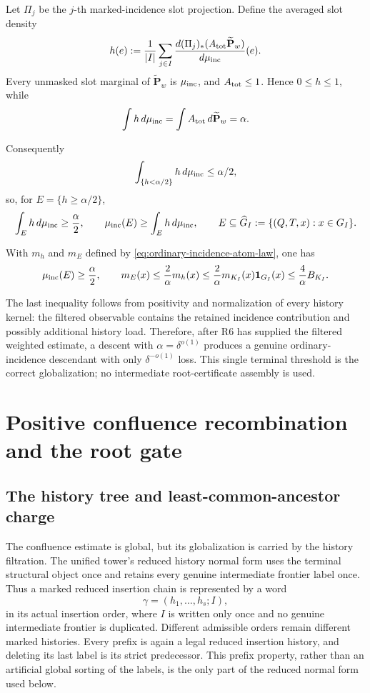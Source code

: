 \documentclass[11pt]{article}
\begin{document}
Let \(\Pi_j\) be the \(j\)-th marked-incidence slot projection.  Define the
averaged slot density
\begin{equation}\label{eq:terminal-rn-weight}
 h(e)
 :=
 \frac1{|I|}\sum_{j\in I}
 \frac{d(\Pi_j)_*(A_{\rm tot}\widetilde{\mathbf P}_w)}{d\mu_{\rm inc}}(e).
\end{equation}
Every unmasked slot marginal of \(\widetilde{\mathbf P}_w\) is \(\mu_{\rm inc}\), and
\(A_{\rm tot}\le1\).  Hence \(0\le h\le1\), while
\[
 \int h\,d\mu_{\rm inc}
 =\int A_{\rm tot}\,d\widetilde{\mathbf P}_w
 =\alpha.
\]

Consequently
\[
 \int_{\{h<\alpha/2\}}h\,d\mu_{\rm inc}\le\alpha/2,
\]
so, for \(E=\{h\ge\alpha/2\}\),
\[
 \int_Eh\,d\mu_{\rm inc}\ge\frac\alpha2,
 \qquad
 \mu_{\rm inc}(E)\ge\int_Eh\,d\mu_{\rm inc},
 \qquad
 E\subseteq\widehat G_I:=\{(Q,T,x):x\in G_I\}.
\]

With \(m_h\) and \(m_E\) defined by
\eqref{eq:ordinary-incidence-atom-law}, one has
\begin{equation}\label{eq:terminal-unweighting}
 \mu_{\rm inc}(E)\ge\frac\alpha2,
 \qquad
 m_E(x)\le\frac2\alpha m_h(x)
 \le\frac2\alpha m_{K_I}(x){\bf1}_{G_I}(x)
 \le\frac4\alpha B_{K_I}.
\end{equation}

The last inequality follows from positivity and normalization of every history
kernel: the filtered observable contains the retained incidence contribution
and possibly additional history load.  Therefore, after R6 has supplied the
filtered weighted estimate, a descent with
\(\alpha=\delta^{o(1)}\) produces a genuine ordinary-incidence descendant with
only \(\delta^{-o(1)}\) loss.  This single terminal threshold is the correct
globalization; no intermediate root-certificate assembly is used.

\section{Positive confluence recombination and the root gate}

\subsection{The history tree and least-common-ancestor charge}

The confluence estimate is global, but its globalization is carried by the
history filtration.  The unified tower's reduced history normal form uses the terminal
structural object once and retains every genuine intermediate frontier label
once.  Thus a marked reduced insertion chain is represented by a word
\[
 \gamma=(h_1,\ldots,h_s;I),
\]
in its actual insertion order, where \(I\) is written only once and no genuine
intermediate frontier is duplicated.  Different admissible orders remain
different marked histories.  Every prefix is again a legal reduced insertion
history, and deleting its last label is its strict predecessor.  This prefix
property, rather than an artificial global sorting of the labels, is the only
part of the reduced normal form used below.
\end{document}
